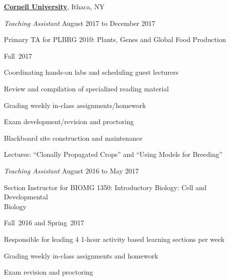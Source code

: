 \documentclass[10pt]{article}
\begin{document}
\href{https://www.cornell.edu/}{\textbf{Cornell University}},
Ithaca, NY
\begin{outerlist}
\item[] \textit{Teaching Assistant}%
    \hfill August 2017 to December 2017\\
    \begin{innerlist}
        \item Primary TA for PLBRG 2010: Plants, Genes and Global Food Production
        \begin{innerlist}
            \item Fall~2017
            \item Coordinating hands-on labs and scheduling guest lecturers
            \item Review and compilation of specialized reading material 
			\item Grading weekly in-class assignments/homework 
            \item Exam development/revision and proctoring
            \item Blackboard site construction and maintenance
            \item Lectures: ``Clonally Propagated Crops'' and ``Using Models for Breeding''
        \end{innerlist}
    \end{innerlist}

\item[] \textit{Teaching Assistant}%
    \hfill August 2016 to May 2017\\
    \begin{innerlist}
        \item Section Instructor for BIOMG 1350: Introductory Biology: Cell and Developmental\\ Biology
        \begin{innerlist}
            \item Fall~2016 and Spring~2017
            \item Responsible for leading 4 1-hour activity based learning sections per week 
             \item Grading weekly in-class assignments and homework 
            \item Exam revision and proctoring
        \end{innerlist}
    \end{innerlist}



\end{outerlist}
\end{document}
